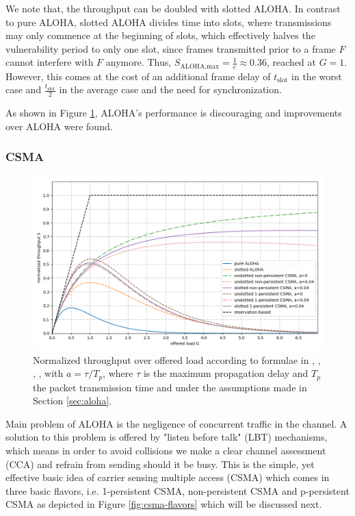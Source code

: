 We note that, the throughput can be doubled with slotted ALOHA. In contrast to pure ALOHA, slotted ALOHA divides time into slots, where transmissions may only commence at the beginning of slots, which effectively halves the vulnerability period to only one slot, since frames transmitted prior to a frame $F$ cannot interfere with $F$ anymore. Thus, $S_\text{ALOHA,max} = \frac{1}{e} \approx 0.36$, reached at $G=1$. However, this comes at the cost of an additional frame delay of $t_\text{slot}$ in the worst case and $\frac{t_\text{slot}}{2}$ in the average case and the need for synchronization. 

As shown in Figure \ref{fig:aloha-csma-performance}, ALOHA's performance is discouraging and improvements over ALOHA were found. 

\subsubsection{CSMA}
\label{sec:csma}

\begin{figure}[tb]
	\label{fig:aloha-csma-performance}
	\begin{center}
		\includegraphics[width=\textwidth]{pictures/aloha_csma_performance}
	\end{center}
	\caption[Normalized throughput over offerered load for various ALOHA and CSMA variants.]{Normalized throughput over offered load according to formulae in \cite{Tanenbaum02}, \cite{Garg07}, \cite{Bachir10},  , with $a=\tau/T_p$, where $\tau$ is the maximum propagation delay and $T_p$ the packet transmission time and under the assumptions made in Section \ref{sec:aloha}. }
\end{figure}

Main problem of ALOHA is the negligence of concurrent traffic in the channel. A solution to this problem is offered by "listen before talk" (LBT) mechanisms, which means in order to avoid collisions we make a clear channel assessment (CCA) and refrain from sending should it be busy. This is the simple, yet effective basic idea of carrier sensing multiple access (CSMA) which comes in three basic flavors, i.e. 1-persistent CSMA, non-persistent CSMA and p-persistent CSMA as depicted in Figure \ref{fig:csma-flavors} which will be discussed next.

